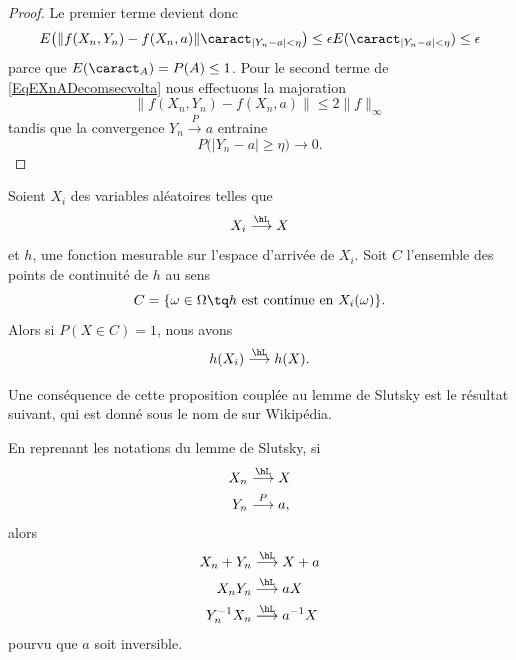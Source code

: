 \begin{proof}
	Le premier terme devient donc
	\begin{equation}
		E\big( \| f(X_n,Y_n)-f(X_n,a) \|\caract_{| Y_n-a |<\eta} \big)\leq \epsilon E(\caract_{| Y_n-a |<\eta})\leq \epsilon
	\end{equation}
	parce que \( E(\caract_A)=P(A)\leq 1\). Pour le second terme de \eqref{EqEXnADecomsecvolta} nous effectuons la majoration
	\begin{equation}
		\| f(X_n,Y_n)-f(X_n,a) \|\leq 2\| f \|_{\infty}
	\end{equation}
	tandis que la convergence \( Y_n\stackrel{P}{\longrightarrow} a\) entraine
	\begin{equation}
		P\big( | Y_n-a |\geq \eta \big)\to 0.
	\end{equation}
\end{proof}

\begin{proposition}     \label{PropcvLsousfonc}
	Soient \( X_i\) des variables aléatoires telles que
	\begin{equation}
		X_i\stackrel{\hL}{\longrightarrow} X
	\end{equation}
	et \( h\), une fonction mesurable sur l'espace d'arrivée de \( X_i\). Soit \( C\) l'ensemble des points de continuité de \( h\) au sens
	\begin{equation}
		C=\{ \omega\in\Omega\tq  h\text{ est continue en } X_i(\omega) \}.
	\end{equation}
	Alors si \( P(X\in C)=1\), nous avons
	\begin{equation}
		h(X_i)\stackrel{\hL}{\longrightarrow}h(X).
	\end{equation}
\end{proposition}

Une conséquence de cette proposition couplée au lemme de Slutsky est le résultat suivant, qui est donné sous le nom de  sur Wikipédia.
\begin{corollary}       \label{CorINgTPH}
	En reprenant les notations du lemme de Slutsky, si
	\begin{subequations}
		\begin{align}
			X_n & \stackrel{\hL}{\longrightarrow} X \\
			Y_n & \stackrel{P}{\longrightarrow} a,
		\end{align}
	\end{subequations}
	alors
	\begin{subequations}
		\begin{align}
			X_n+Y_n     & \stackrel{\hL}{\longrightarrow}X+a     \\
			X_nY_n      & \stackrel{\hL}{\longrightarrow}aX      \\
			Y_n^{-1}X_n & \stackrel{\hL}{\longrightarrow}a^{-1}X \\
		\end{align}
	\end{subequations}
	pourvu que \( a\) soit inversible.
\end{corollary}


